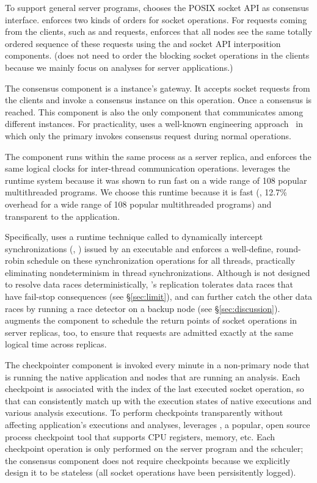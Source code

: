 To support general server programs, \xxx chooses the POSIX socket API as
consensus interface. \xxx enforces two kinds of orders for socket
operations.  For requests coming from the clients, such as \connect and
\send requests, \xxx enforces that all nodes see the same totally ordered
sequence of these requests using the \paxos and socket API interposition
components.  (\xxx does not need to order the blocking socket operations
in the clients because we mainly focus on analyses for server applications.)


The \paxos consensus component is a \xxx instance's gateway.  It accepts socket
requests from the clients and invoke a \paxos consensus instance on this 
operation. Once a consensus is reached. This component is also the only \xxx 
component that communicates among different \xxx instances. For practicality, 
\xxx uses a well-known \paxos engineering approach~\cite{paxos:practical} in 
which only the primary invokes consensus request during normal operations.

The \dmt component runs within the same process as a server replica, and
enforces the same logical clocks for inter-thread communication
operations. \xxx leverages the \parrot~\cite{parrot:sosp13} \dmt runtime
system because it was shown to run fast on a wide range of 108 popular
multithreaded programs. We choose this \dmt runtime because it is fast (\ie, 
12.7\% overhead for a wide range of 108 popular multithreaded programs) and 
transparent to the application.

Specifically, \parrot uses a runtime technique called \ldpreload to dynamically 
intercept \pthread synchronizations (\eg, \mutexlock) issued by an executable 
and enforces a well-define, round-robin schedule on these synchronization 
operations for all threads, practically eliminating nondeterminism in thread
synchronizations. Although \parrot is not designed to resolve data races
deterministically, \xxx's replication tolerates data races that have
fail-stop consequences (see \S\ref{sec:limit}), and can further catch the
other data races by running a race detector on a backup node (see
\S\ref{sec:discussion}).  \xxx augments the \dmt component to schedule the
return points of socket operations in server replicas, too, to ensure that
requests are admitted exactly at the same logical time across replicas.

The checkpointer component is invoked every minute in a non-primary node that 
is running the native application and nodes that are running an analysis. Each 
checkpoint is associated with the index of the last executed socket operation, 
so that \xxx can consistently match up with the execution states of native 
executions and various analysis executions. To perform checkpoints 
transparently without affecting application's executions and analyses, \xxx 
leverages \criu, a popular, open source process checkpoint tool that supports 
CPU registers, memory, etc. Each checkpoint operation is only performed on the 
server program and the \dmt schculer; the \paxos consensus component does not 
require checkpoints because we explicitly design it to be stateless (all socket 
operations have been persisitently logged).

